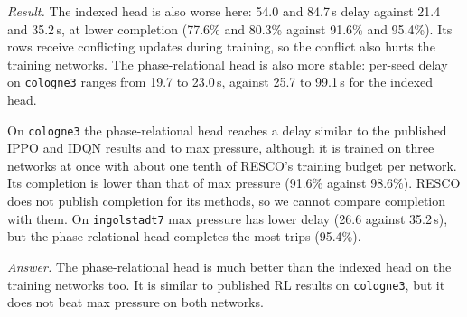 \documentclass[conference]{IEEEtran}
\begin{document}
\emph{Result.} The indexed head is also worse here: 54.0 and 84.7\,s delay against 21.4
and 35.2\,s, at lower completion (77.6\% and 80.3\% against 91.6\% and 95.4\%). Its rows
receive conflicting updates during training, so the conflict also hurts the training
networks. The phase-relational head is also more stable: per-seed delay on
\texttt{cologne3} ranges from 19.7 to 23.0\,s, against 25.7 to 99.1\,s for the indexed head.

On \texttt{cologne3} the phase-relational head reaches a delay similar to the published
IPPO and IDQN results and to max pressure, although it is trained on three networks at
once with about one tenth of RESCO's training budget per network. Its completion is lower
than that of max pressure (91.6\% against 98.6\%). RESCO does not publish completion for
its methods, so we cannot compare completion with them. On \texttt{ingolstadt7} max
pressure has lower delay (26.6 against 35.2\,s), but the phase-relational head completes
the most trips (95.4\%).

\emph{Answer.} The phase-relational head is much better than the indexed head on the
training networks too. It is similar to published RL results on \texttt{cologne3}, but it
does not beat max pressure on both networks.
\end{document}

